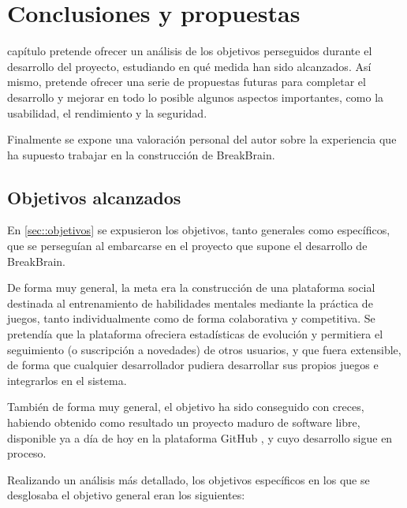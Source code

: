 \chapter{Conclusiones y propuestas}
\label{chap:conclusiones}

 capítulo pretende ofrecer un análisis de los objetivos perseguidos durante el desarrollo del proyecto, estudiando en qué medida han sido alcanzados. Así mismo, pretende ofrecer una serie de propuestas futuras para completar el desarrollo y mejorar en todo lo posible algunos aspectos importantes, como la usabilidad, el rendimiento y la seguridad.

Finalmente se expone una valoración personal del autor sobre la experiencia que ha supuesto trabajar en la construcción de BreakBrain.

\section{Objetivos alcanzados}

En \ref{sec::objetivos} se expusieron los objetivos, tanto generales como específicos, que se perseguían al embarcarse en el proyecto que supone el desarrollo de BreakBrain.

De forma muy general, la meta era la construcción de una plataforma social destinada al entrenamiento de habilidades mentales mediante la práctica de juegos, tanto individualmente como de forma colaborativa y competitiva. Se pretendía que la plataforma ofreciera estadísticas de evolución y permitiera el seguimiento (o suscripción a novedades) de otros usuarios, y que fuera extensible, de forma que cualquier desarrollador pudiera desarrollar sus propios juegos e integrarlos en el sistema.

También de forma muy general, el objetivo ha sido conseguido con creces, habiendo obtenido como resultado un proyecto maduro de software libre, disponible ya a día de hoy en la plataforma GitHub \cite{github}, y cuyo desarrollo sigue en proceso.

Realizando un análisis más detallado, los objetivos específicos en los que se desglosaba el objetivo general eran los siguientes:

